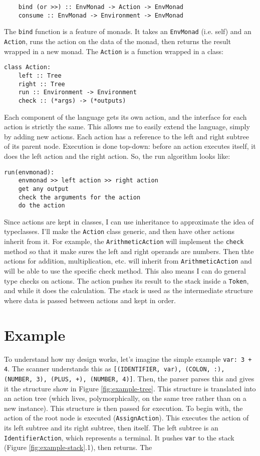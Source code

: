\documentclass[a4paper, 11pt]{report}
\begin{document}
{{\begin{verbatim}
    bind (or >>) :: EnvMonad -> Action -> EnvMonad
    consume :: EnvMonad -> Environment -> EnvMonad
\end{verbatim}

The \verb|bind| function is a feature of monads. It takes an \verb|EnvMonad| (i.e. self) and an \verb|Action|, runs the action on the data of the monad, then returns the result wrapped in a new monad. The \verb|Action| is a function wrapped in a class:
\begin{verbatim}
class Action:
    left :: Tree
    right :: Tree
    run :: Environment -> Environment
    check :: (*args) -> (*outputs)
\end{verbatim}

Each component of the language gets its own action, and the interface for each action is strictly the same. This allows me to easily extend the language, simply by adding new actions. Each action has a reference to the left and right subtree of its parent node. Execution is done top-down: before an action executes itself, it does the left action and the right action. So, the run algorithm looks like:

\begin{verbatim}
run(envmonad):
    envmonad >> left action >> right action
    get any output
    check the arguments for the action
    do the action
\end{verbatim}

Since actions are kept in classes, I can use inheritance to approximate the idea of typeclasses. I'll make the \verb|Action| class generic, and then have other actions inherit from it. For example, the \verb|ArithmeticAction| will implement the \verb|check| method so that it make sures the left and right operands are numbers. Then thte actions for addition, multiplication, etc. will inherit from \verb|ArithmeticAction| and will be able to use the specific check method. This also means I can do general type checks on actions. The action pushes its result to the stack inside a \verb|Token|, and while it does the calculation. The stack is used as the intermediate structure where data is passed between actions and kept in order.

\section{Example}

To understand how my design works, let's imagine the simple example \verb|var: 3 + 4|. The scanner understands this as \texttt{[(IDENTIFIER, var), (COLON, :), (NUMBER, 3), (PLUS, +), (NUMBER, 4)]}. Then, the parser parses this and gives it the structure show in Figure \ref{fig:example-tree}. This structure is translated into an action tree (which lives, polymorphically, on the same tree rather than on a new instance). This structure is then passed for execution. To begin with, the action of the root node is executed (\verb|AssignAction|). This executes the action of its left subtree and its right subtree, then itself. The left subtree is an \verb|IdentifierAction|, which represents a terminal. It pushes \verb|var| to the stack (Figure \ref{fig:example-stack}.1), then returns. The 

}}
\end{document}
